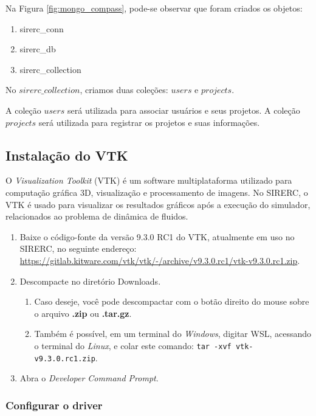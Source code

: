 \documentclass[a4paper,11pt]{article}
\newcommand{\sistema}{\textsf{SIRERC}}
\newcommand{\windows}{\textit{Windows}}
\newcommand{\linux}{\textit{Linux}}
\begin{document}
Na Figura \ref{fig:mongo_compass}, pode-se observar que foram criados os objetos:
\begin{enumerate}
\item sirerc\_conn
\item sirerc\_db
\item sirerc\_collection
\end{enumerate}

No $sirerc\_collection$, criamos duas coleções: $users$ e $projects$.

A coleção $users$ será utilizada para associar usuários e seus projetos. A coleção $projects$ será utilizada para registrar os projetos e suas informações. 

\color{black}

\newpage
\subsection{Instalação do VTK}
\label{vtk}

O \emph{Visualization Toolkit} (VTK) é um software multiplataforma utilizado para computação gráfica 3D, visualização e processamento de imagens. No \sistema{}, o VTK é usado para visualizar os resultados gráficos após a execução do simulador, relacionados ao problema de dinâmica de fluidos.

\begin{enumerate}
	\item Baixe o código-fonte da versão 9.3.0 RC1 do VTK, atualmente em uso no \sistema{}, no seguinte endereço: \url{https://gitlab.kitware.com/vtk/vtk/-/archive/v9.3.0.rc1/vtk-v9.3.0.rc1.zip}.
	\item Descompacte no diretório Downloads.
	
	\begin{enumerate}
	\item 	Caso deseje, você pode descompactar com o botão direito do mouse sobre o arquivo \textbf{.zip} ou \textbf{.tar.gz}.
	\item 	Também é possível, em um terminal do \windows{}, digitar WSL, acessando o terminal do \linux{}, e colar este comando: {\tt tar -xvf vtk-v9.3.0.rc1.zip}.
	\end{enumerate}
	
	\item Abra o \textit{Developer Command Prompt}.
\end{enumerate}


\subsubsection{Configurar o driver}
\end{document}
